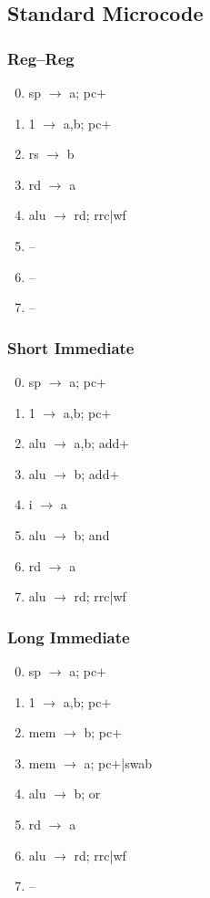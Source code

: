\documentclass[11pt]{book}
\begin{document}
\subsection*{Standard Microcode}
\begin{multicols}{3}\ttfamily\selectfont\small
  \subsubsection*{Reg--Reg}
  \begin{enumerate}\setcounter{enumi}{-1}
  \item sp \(\rightarrow\) a; pc\(+\)
  \item 1 \(\rightarrow\) a,b; pc\(+\)
  \item rs \(\rightarrow\) b
  \item rd \(\rightarrow\) a
  \item alu \(\rightarrow\) rd; rrc|wf
  \item --
  \item --
  \item --
  \end{enumerate}
  \columnbreak
  \subsubsection*{Short Immediate}
  \begin{enumerate}\setcounter{enumi}{-1}
  \item sp \(\rightarrow\) a; pc\(+\)
  \item 1 \(\rightarrow\) a,b; pc\(+\)
  \item alu \(\rightarrow\) a,b; add+
  \item alu \(\rightarrow\) b; add+
  \item i \(\rightarrow\) a
  \item alu \(\rightarrow\) b; and
  \item rd \(\rightarrow\) a
  \item alu \(\rightarrow\) rd; rrc|wf
  \end{enumerate}
  \columnbreak
  \subsubsection*{Long Immediate}
  \begin{enumerate}\setcounter{enumi}{-1}
  \item sp \(\rightarrow\) a; pc\(+\)
  \item 1 \(\rightarrow\) a,b; pc\(+\)
  \item mem \(\rightarrow\) b; pc\(+\)
  \item mem \(\rightarrow\) a; pc\(+\)|swab
  \item alu \(\rightarrow\) b; or
  \item rd \(\rightarrow\) a
  \item alu \(\rightarrow\) rd; rrc|wf
  \item --
  \end{enumerate}
\end{multicols}
\end{document}
